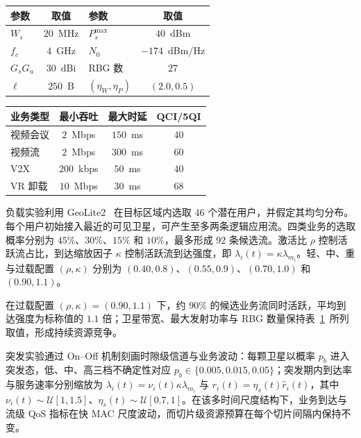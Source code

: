 \begin{table}[!htp]
\centering
{}
\label{tab:ch4_params}
\small
\renewcommand{\arraystretch}{1.2}
\begin{tabular}{lclc}
\toprule
参数 & 取值 & 参数 & 取值 \\
\midrule
$W_s$ & $20$~MHz & $P_s^{\max}$ & $40$~dBm \\
$f_c$ & $4$~GHz & $N_0$ & $-174$~dBm/Hz \\
$G_sG_u$ & $30$~dBi & RBG 数 & $27$ \\
$\ell$ & $250$~B & $(\eta_W,\eta_P)$ & $(2.0,0.5)$ \\
\bottomrule
\end{tabular}
\end{table}

\begin{table}[!htp]
\centering
{}
\label{tab:ch4_traffic}
\small
\renewcommand{\arraystretch}{1.2}
\begin{tabular}{lccc}
\toprule
业务类型 & 最小吞吐 & 最大时延 & QCI/5QI \\
\midrule
视频会议 & $2$~Mbps & $150$~ms & $40$ \\
视频流 & $2$~Mbps & $300$~ms & $60$ \\
V2X & $200$~kbps & $50$~ms & $40$ \\
VR 卸载 & $10$~Mbps & $30$~ms & $68$ \\
\bottomrule
\end{tabular}
\end{table}

负载实验利用 GeoLite2~\cite{maxmind_geolite2_2021} 在目标区域内选取 46 个潜在用户，并假定其均匀分布。每个用户初始接入最近的可见卫星，可产生至多两条逻辑应用流。四类业务的选取概率分别为 $45\%$、$30\%$、$15\%$ 和 $10\%$，最多形成 92 条候选流。激活比 $\rho$ 控制活跃流占比，到达缩放因子 $\kappa$ 控制活跃流到达强度，即 $\lambda_i(t)=\kappa\lambda_{m_i}$。轻、中、重与过载配置 $(\rho,\kappa)$ 分别为 $(0.40,0.8)$、$(0.55,0.9)$、$(0.70,1.0)$ 和 $(0.90,1.1)$。

在过载配置 $(\rho,\kappa)=(0.90,1.1)$ 下，约 $90\%$ 的候选业务流同时活跃，平均到达强度为标称值的 $1.1$ 倍；卫星带宽、最大发射功率与 RBG 数量保持表~\ref{tab:ch4_params}~所列取值，形成持续资源竞争。

突发实验通过 On--Off 机制刻画时隙级信道与业务波动：每颗卫星以概率 $p_b$ 进入突发态，低、中、高三档不确定性对应 $p_b\in\{0.005,0.015,0.05\}$；突发期内到达率与服务速率分别缩放为 $\lambda_i(t)=\nu_i(t)\kappa\lambda_{m_i}$ 与 $r_i(t)=\eta_s(t)\hat r_i(t)$，其中 $\nu_i(t)\sim\mathcal U[1,1.5]$、$\eta_s(t)\sim\mathcal U[0.7,1]$。在该多时间尺度结构下，业务到达与流级 QoS 指标在快 MAC 尺度波动，而切片级资源预算在每个切片间隔内保持不变。

